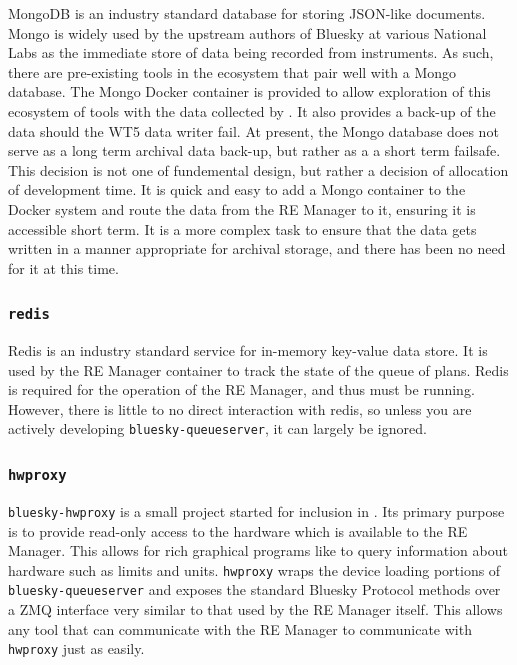 MongoDB\cite{Dirolf_Chodorow_2010} is an industry standard database for storing JSON-like documents.
Mongo is widely used by the upstream authors of Bluesky at various National Labs as the immediate store of data being recorded from instruments.
As such, there are pre-existing tools in the ecosystem that pair well with a Mongo database.
The Mongo Docker container is provided to allow exploration of this ecosystem of tools with the data collected by \biab.
It also provides a back-up of the data should the WT5 data writer fail.
At present, the Mongo database does not serve as a long term archival data back-up, but rather as a a short term failsafe.
This decision is not one of fundemental design, but rather a decision of allocation of development time.
It is quick and easy to add a Mongo container to the Docker system and route the data from the RE Manager to it, ensuring it is accessible short term.
It is a more complex task to ensure that the data gets written in a manner appropriate for archival storage, and there has been no need for it at this time.

\subsubsection{\texttt{redis}}

Redis\cite{redis} is an industry standard service for in-memory key-value data store.
It is used by the RE Manager container to track the state of the queue of plans.
Redis is required for the operation of the RE Manager, and thus must be running.
However, there is little to no direct interaction with redis, so unless you are actively developing \texttt{bluesky-queueserver}, it can largely be ignored.

\subsubsection{\texttt{hwproxy}}

\texttt{bluesky-hwproxy}\cite{bluesky-hwproxy} is a small project started for inclusion in \biab.
Its primary purpose is to provide read-only access to the hardware which is available to the RE Manager.
This allows for rich graphical programs like \blueskycmds to query information about hardware such as limits and units.
\texttt{hwproxy} wraps the device loading portions of \texttt{bluesky-queueserver} and exposes the standard Bluesky Protocol methods over a ZMQ interface very similar to that used by the RE Manager itself.
This allows any tool that can communicate with the RE Manager to communicate with \texttt{hwproxy} just as easily.

